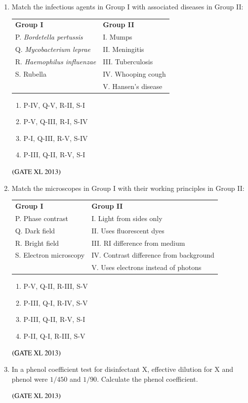 \documentclass[journal]{IEEEtran}
\begin{document}
\begin{enumerate}
\begin{enumerate}[label=\arabic*., start=11]
\item Match the infectious agents in Group I with associated diseases in Group II:  
\begin{tabular}{ll}
\textbf{Group I} & \textbf{Group II} \\
P. \textit{Bordetella pertussis} & I. Mumps \\
Q. \textit{Mycobacterium leprae} & II. Meningitis \\
R. \textit{Haemophilus influenzae} & III. Tuberculosis \\
S. Rubella & IV. Whooping cough \\
& V. Hansen's disease \\
\end{tabular}
\begin{enumerate}
\item P-IV, Q-V, R-II, S-I
\item P-V, Q-III, R-I, S-IV
\item P-I, Q-III, R-V, S-IV
\item P-III, Q-II, R-V, S-I
\end{enumerate}
\hfill $\left(\text{GATE XL 2013}\right)$

\item Match the microscopes in Group I with their working principles in Group II:  
\begin{tabular}{ll}
\textbf{Group I} & \textbf{Group II} \\
P. Phase contrast & I. Light from sides only \\
Q. Dark field & II. Uses fluorescent dyes \\
R. Bright field & III. RI difference from medium \\
S. Electron microscopy & IV. Contrast difference from background \\
& V. Uses electrons instead of photons \\
\end{tabular}
\begin{enumerate}
\item P-V, Q-II, R-III, S-V
\item P-III, Q-I, R-IV, S-V
\item P-III, Q-II, R-V, S-I
\item P-II, Q-I, R-III, S-V
\end{enumerate}
\hfill $\left(\text{GATE XL 2013}\right)$

\item In a phenol coefficient test for disinfectant X, effective dilution for X and phenol were $1/450$ and $1/90$. Calculate the phenol coefficient.
\begin{enumerate}
\end{enumerate}
\hfill $\left(\text{GATE XL 2013}\right)$


\end{enumerate}
\end{enumerate}
\end{document}
